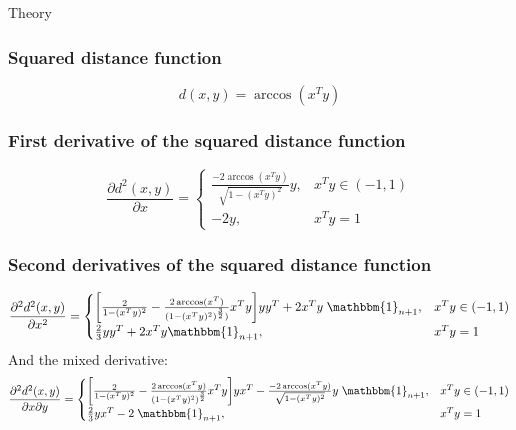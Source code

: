 \begin{chapter}{Theory}
\subsubsection{Squared distance function} %
\label{ssub:SquareddistanceS2}
\begin{equation}
    d(x,y)=\arccos(x^Ty)
\end{equation}

\subsubsection{First derivative of the squared distance function} %
\label{ssub:FirstDerS2}
\begin{equation}
    \frac{\partial d^2(x,y)}{\partial x}=\begin{cases}
	\frac{-2\arccos(x^Ty)}{\sqrt{1-(x^Ty)^{2}}}y, & x^Ty\in (-1,1)\\
	-2y, & x^Ty=1
    \end{cases}
\end{equation}

\subsubsection{Second derivatives of the squared distance function} %
\label{ssub:SecondDerS2}
\begin{equation}
    \frac{\partial^2 d^2(x,y)}{\partial x^2}=\begin{cases}
	\bigg[\frac{2}{1-(x^Ty)^2}-\frac{2\arccos(x^T)}{(1-(x^Ty)^{2})^{\frac{3}{2}})}x^Ty\bigg]yy^T+2x^Ty\;\mathbbm{1}_{n+1}, & x^Ty\in(-1,1)\\
	\frac{2}{3}yy^T+2x^Ty\mathbbm{1}_{n+1}, & x^Ty=1
    \end{cases}
\end{equation}
And the mixed derivative:
\begin{equation}
    \frac{\partial^2 d^2(x,y)}{\partial x\partial y}=\begin{cases}
	\bigg[\frac{2}{1-(x^Ty)^2}-\frac{2\arccos(x^Ty)}{(1-(x^Ty)^{2})^{\frac{3}{2}}}x^Ty\bigg]yx^T-\frac{-2\arccos(x^Ty)}{\sqrt{1-(x^Ty)^{2}}}y\;\mathbbm{1}_{n+1} , & x^Ty\in(-1,1)\\
	\frac{2}{3}yx^T -2\;\mathbbm{1}_{n+1}, & x^Ty=1
    \end{cases}
\end{equation}



\end{chapter}
